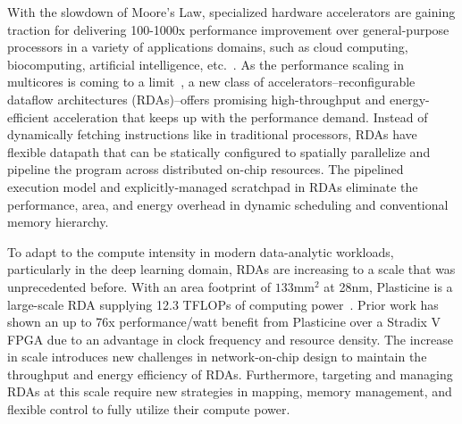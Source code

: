 
With the slowdown of Moore’s Law, specialized hardware accelerators are gaining traction
for delivering 100-1000x performance improvement over general-purpose
processors in a variety of applications domains, such as cloud computing, biocomputing, 
artificial intelligence, etc.~\cite{fpgacloudsurvey,bioaccel,genomicaccel}.
As the performance scaling in multicores is coming to a limit~\cite{multicorescale}, a new
class of accelerators--reconfigurable dataflow architectures (RDAs)--offers  
promising high-throughput and energy-efficient acceleration that keeps up with the performance demand.
Instead of dynamically fetching instructions like in traditional processors, RDAs have flexible datapath 
that can be statically configured to spatially parallelize and pipeline the program across
distributed on-chip resources. 
The pipelined execution model and explicitly-managed scratchpad in RDAs eliminate
the performance, area, and energy overhead in dynamic scheduling and conventional memory hierarchy.

To adapt to the compute intensity in modern data-analytic workloads, particularly in the deep learning
domain, RDAs are increasing to a scale that was unprecedented before.
With an area footprint of $133\text{mm}^2$ at 28nm, 
Plasticine is a large-scale RDA supplying 12.3 TFLOPs of computing power~\cite{plasticine}.
Prior work has shown an up to 76x performance/watt benefit from Plasticine over a Stradix V FPGA 
due to an advantage in clock frequency and resource density.
The increase in scale introduces new challenges in network-on-chip design to maintain 
the throughput and energy efficiency of RDAs.
Furthermore, targeting and managing RDAs at this scale require new strategies in mapping, 
memory management, and flexible control to fully utilize their compute power. 

